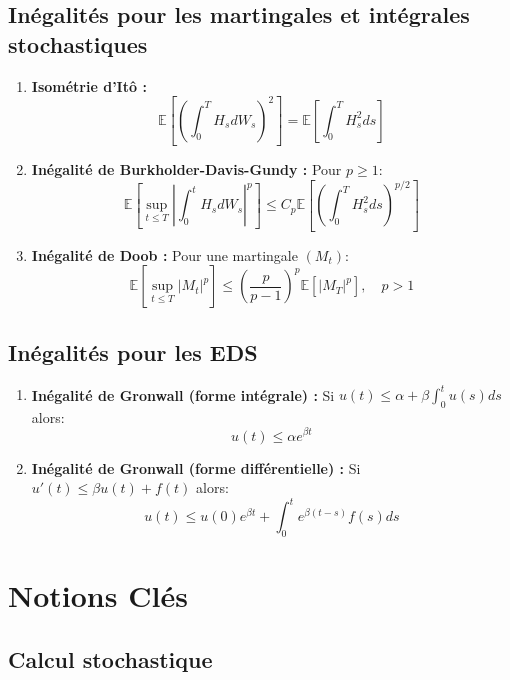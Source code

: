 \documentclass[12pt,a4paper]{article}
\theoremstyle{definition}
\newcommand{\E}{\mathbb{E}}
\begin{document}
\subsection{Inégalités pour les martingales et intégrales stochastiques}

\begin{enumerate}
    \item \textbf{Isométrie d'Itô :}
    \[
    \E\left[ \left( \int_0^T H_s dW_s \right)^2 \right] = \E\left[ \int_0^T H_s^2 ds \right]
    \]
    
    \item \textbf{Inégalité de Burkholder-Davis-Gundy :} Pour $p \geq 1$:
    \[
    \E\left[ \sup_{t \leq T} \left| \int_0^t H_s dW_s \right|^p \right] \leq C_p \E\left[ \left( \int_0^T H_s^2 ds \right)^{p/2} \right]
    \]
    
    \item \textbf{Inégalité de Doob :} Pour une martingale $(M_t)$:
    \[
    \E\left[ \sup_{t \leq T} |M_t|^p \right] \leq \left( \frac{p}{p-1} \right)^p \E[|M_T|^p], \quad p > 1
    \]
\end{enumerate}

\subsection{Inégalités pour les EDS}

\begin{enumerate}
    \item \textbf{Inégalité de Gronwall (forme intégrale) :} Si $u(t) \leq \alpha + \beta \int_0^t u(s) ds$ alors:
    \[
    u(t) \leq \alpha e^{\beta t}
    \]
    
    \item \textbf{Inégalité de Gronwall (forme différentielle) :} Si $u'(t) \leq \beta u(t) + f(t)$ alors:
    \[
    u(t) \leq u(0)e^{\beta t} + \int_0^t e^{\beta(t-s)} f(s) ds
    \]
\end{enumerate}

\section{Notions Clés}

\subsection{Calcul stochastique}
\end{document}
